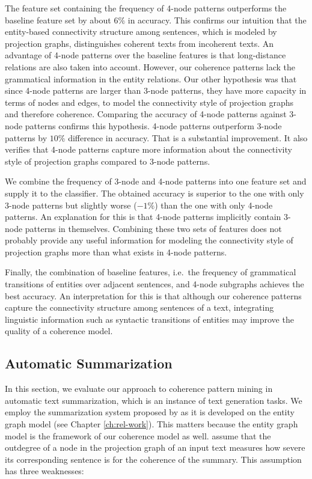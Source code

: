 The feature set containing the frequency of 4-node patterns outperforms the baseline feature set by about $6\%$ in accuracy. 
This confirms our intuition that the entity-based connectivity structure among sentences, which is modeled by projection graphs, distinguishes coherent texts from incoherent texts. 
An advantage of 4-node patterns over the baseline features is that long-distance relations are also taken into account. 
However, our coherence patterns lack the grammatical information in the entity relations. 
Our other hypothesis was that since 4-node patterns are larger than 3-node patterns, they have more capacity in terms of nodes and edges, to model the connectivity style of projection graphs and therefore coherence. 
 Comparing the accuracy of 4-node patterns against 3-node patterns confirms this hypothesis. 
4-node patterns outperform 3-node patterns by $10\%$ difference in accuracy. 
That is a substantial improvement. 
It also verifies that 4-node patterns capture more information about the connectivity style of projection graphs compared to 3-node patterns.      

We combine the frequency of 3-node and 4-node patterns into one feature set and supply it to the classifier.   
The obtained accuracy is superior to the one with only 3-node patterns but slightly worse  ($-1\%$) than the one with only 4-node patterns. 
An explanation for this is that 4-node patterns implicitly contain 3-node patterns in themselves. 
Combining these two sets of features does not probably provide any useful information for modeling the connectivity style of projection graphs more than what exists in 4-node patterns. 

Finally, the combination of baseline features, i.e.\ the frequency of grammatical transitions of entities over adjacent sentences, and 4-node subgraphs achieves the best accuracy. 
An interpretation for this is that although our coherence patterns capture the connectivity structure among sentences of a text, integrating linguistic information such as syntactic transitions of entities may improve the quality of a coherence model.  

\subsection{Automatic Summarization}
\label{sec:auto-summarization}

In this section, we evaluate our approach to coherence pattern mining in automatic text summarization, which is an instance of text generation tasks.  
We employ the summarization system proposed by  as it is developed on the entity graph model (see Chapter \ref{ch:rel-work}). 
This matters because the entity graph model is the framework of our coherence model as well.  
 assume that the outdegree of a node in the projection graph of an input text measures how severe its corresponding sentence is for the coherence of the summary.  
This assumption has three weaknesses: 

